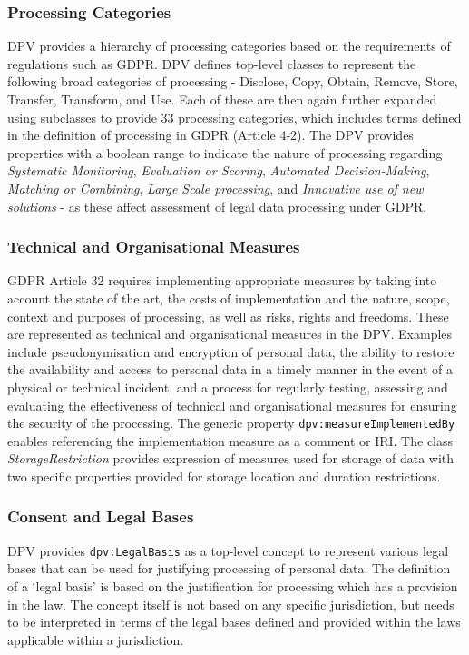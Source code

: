\subsubsection{Processing Categories}
DPV provides a hierarchy of processing categories based on the requirements of regulations such as GDPR. 
DPV defines top-level classes to represent the following broad categories of processing - Disclose, Copy, Obtain, Remove, Store, Transfer, Transform, and Use.
Each of these are then again further expanded using subclasses to provide 33 processing categories, which includes terms defined in the definition of processing in GDPR (Article 4-2).
The DPV provides properties with a boolean range to indicate the nature of processing regarding \emph{Systematic Monitoring}, \emph{Evaluation or Scoring}, \emph{Automated Decision-Making}, \emph{Matching or Combining}, \emph{Large Scale processing}, and \emph{Innovative use of new solutions} - as these affect assessment of legal data processing under GDPR.

\subsubsection{Technical and Organisational Measures}
GDPR Article 32 requires implementing appropriate measures by taking into account the state of the art, the costs of implementation and the nature, scope, context and purposes of processing, as well as risks, rights and freedoms.
These are represented as technical and organisational measures in the DPV.
Examples include pseudonymisation and encryption of personal data, the ability to restore the availability and access to personal data in a timely manner in the event of a physical or technical incident, and a process for regularly testing, assessing and evaluating the effectiveness of technical and organisational measures for ensuring the security of the processing.
The generic property \texttt{dpv:measureImplementedBy} enables referencing the implementation measure as a comment or IRI.
The class \emph{StorageRestriction} provides expression of measures used for storage of data with two specific properties provided for storage location and duration restrictions.

\subsubsection{Consent and Legal Bases}
DPV provides \texttt{dpv:LegalBasis} as a top-level concept to represent various legal bases that can be used for justifying processing of personal data.
The definition of a `legal basis' is based on the justification for processing which has a provision in the law. The concept itself is not based on any specific jurisdiction, but needs to be interpreted in terms of the legal bases defined and provided within the laws applicable within a jurisdiction.

